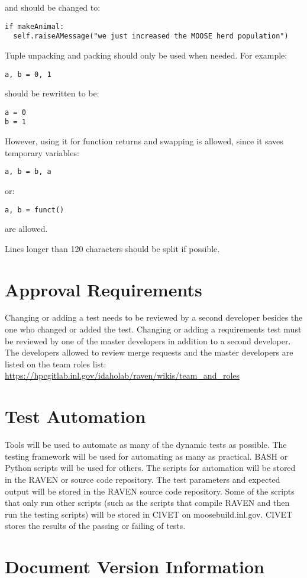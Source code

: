 \documentclass{article}
\begin{document}
and should be changed to:

\begin{verbatim}
if makeAnimal:
  self.raiseAMessage("we just increased the MOOSE herd population")
\end{verbatim}

Tuple unpacking and packing should only be used when needed. For example:

\begin{verbatim}
a, b = 0, 1
\end{verbatim}

should be rewritten to be:

\begin{verbatim}
a = 0
b = 1
\end{verbatim}

However, using it for function returns and swapping is allowed, since
it saves temporary variables:

\begin{verbatim}
a, b = b, a
\end{verbatim}

or:

\begin{verbatim}
a, b = funct()
\end{verbatim}

are allowed.

Lines longer than 120 characters should be split if possible.

\section{Approval Requirements}

Changing or adding a test needs to be reviewed by a second developer
besides the one who changed or added the test.  Changing or adding a
requirements test must be reviewed by one of the master developers in
addition to a second developer.  The developers allowed to review
merge requests and the master developers are listed on the team roles
list:
\url{https://hpcgitlab.inl.gov/idaholab/raven/wikis/team_and_roles}



\section{Test Automation}

Tools will be used to automate as many of the dynamic tests as
possible.  The testing framework will be used for automating as
many as practical.  BASH or Python scripts will be used for others.
The scripts for automation will be stored in the RAVEN or
source code repository.  The test parameters and expected output will
be stored in the RAVEN source code repository. Some of the
scripts that only run other scripts (such as the scripts that compile
RAVEN and then run the testing scripts) will be stored in CIVET on
moosebuild.inl.gov.  CIVET stores the results of the passing or
failing of tests.

\section*{Document Version Information}


\end{document}
